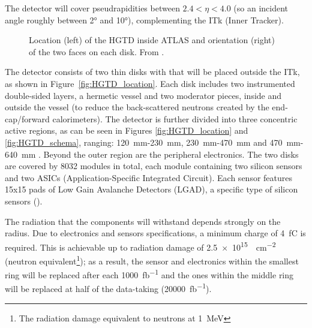 The detector will cover pseudrapidities between $2.4 < \eta < 4.0$ (so an incident angle roughly between 2° and 10°), complementing the ITk (Inner Tracker).
\begin{figure}[!ht]
    \centering
    \hfill
    \centering
    \captionsetup{width=\captionwidth}
    \caption{Location (left) of the HGTD inside ATLAS and orientation (right) of the two faces on each disk. From \cite{cernTechnicalDesign}.}
\end{figure}

The detector consists of two thin disks with that will be placed outside the ITk, as shown in Figure~\ref{fig:HGTD_location}. Each disk includes two instrumented double-sided layers, a hermetic vessel and two moderator pieces, inside and outside the vessel (to reduce the back-scattered neutrons created by the end-cap/forward calorimeters). The detector is further divided into three concentric active regions, as can be seen in Figures \ref{fig:HGTD_location} and \ref{fig:HGTD_schema}, ranging: \qty{120}{\milli\meter}-\qty{230}{\milli\meter}, \qty{230}{\milli\meter}-\qty{470}{\milli\meter} and \qty{470}{\milli\meter}-\qty{640}{\milli\meter} \cite{CERN-LHCC-2020-007}. Beyond the outer region are the peripheral electronics.
The two disks are covered by 8032 modules in total, each module containing two silicon sensors and two ASICs (Application-Specific Integrated Circuit). Each sensor features 15x15 pads of Low Gain Avalanche Detectors (LGAD), a specific type of silicon sensors ().

The radiation that the components will withstand depends strongly on the radius. Due to electronics and sensors specifications, a minimum charge of \qty{4}{\femto\coulomb} is required. This is achievable up to radiation damage of \qty{2.5e15}{\neutroneq\centi\meter^{-2}} (neutron equivalent\footnote{The radiation damage equivalent to neutrons at \qty{1}{\mega\electronvolt}}); as a result, the sensor and electronics within the smallest ring will be replaced after each \qty{1000}{\femto\barn^{-1}} and the ones within the middle ring will be replaced at half of the data-taking (\qty{20000}{\femto\barn^{-1}}).

